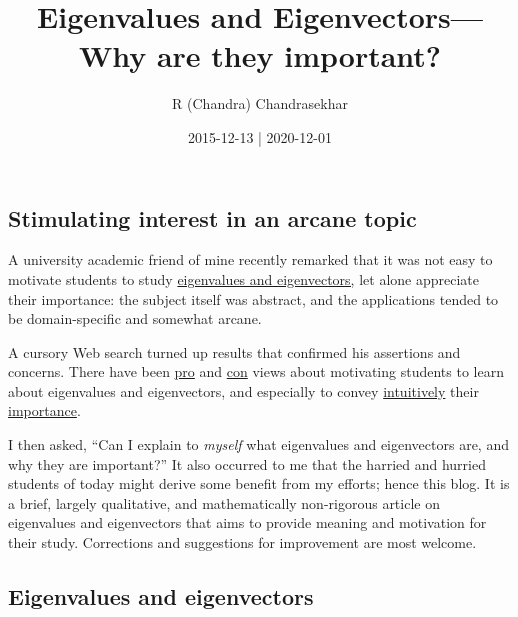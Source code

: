 \documentclass[
  11pt,
  a4paper,
]{article}
\title{Eigenvalues and Eigenvectors---Why are they important?}
\author{R (Chandra) Chandrasekhar}
\date{2015-12-13 | 2020-12-01}
\begin{document}
\maketitle

\thispagestyle{empty}


\hypertarget{stimulating-interest-in-an-arcane-topic}{%
\subsection{Stimulating interest in an arcane
topic}\label{stimulating-interest-in-an-arcane-topic}}

A university academic friend of mine recently remarked that it was not
easy to motivate students to study
\href{https://en.wikipedia.org/wiki/Eigenvalues_and_eigenvectors}{eigenvalues
and eigenvectors,} let alone appreciate their importance: the subject
itself was abstract, and the applications tended to be domain-specific
and somewhat arcane.

A cursory Web search turned up results that confirmed his assertions and
concerns. There have been
\href{http://matheducators.stackexchange.com/questions/520/what-is-a-good-motivation-showcase-for-a-student-for-the-study-of-eigenvalues}{pro}
and
\href{http://matheducators.stackexchange.com/questions/8586/too-much-motivation}{con}
views about motivating students to learn about eigenvalues and
eigenvectors, and especially to convey
\href{http://matheducators.stackexchange.com/questions/3983/what-is-the-best-way-to-intuitively-explain-what-eigenvectors-and-eigenvalues-ar}{intuitively}
their
\href{http://math.stackexchange.com/questions/23312/what-is-the-importance-of-eigenvalues-eigenvectors}{importance}.

I then asked, ``Can I explain to \emph{myself} what eigenvalues and
eigenvectors are, and why they are important?'' It also occurred to me
that the harried and hurried students of today might derive some benefit
from my efforts; hence this blog. It is a brief, largely qualitative,
and mathematically non-rigorous article on eigenvalues and eigenvectors
that aims to provide meaning and motivation for their study. Corrections
and suggestions for improvement are most welcome. 
\normalfont

\hypertarget{eigenvalues-and-eigenvectors}{%
\subsection{Eigenvalues and
eigenvectors}\label{eigenvalues-and-eigenvectors}}
\end{document}
